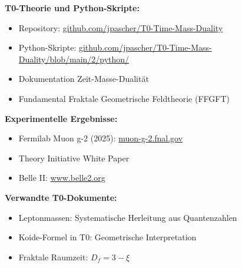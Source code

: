 	\textbf{T0-Theorie und Python-Skripte:}
	\begin{itemize}
		\item Repository: \href{https://github.com/jpascher/T0-Time-Mass-Duality}{github.com/jpascher/T0-Time-Mass-Duality}
		\item Python-Skripte: \href{https://github.com/jpascher/T0-Time-Mass-Duality/blob/main/2/python/}{github.com/jpascher/T0-Time-Mass-Duality/blob/main/2/python/}
		\item Dokumentation Zeit-Masse-Dualität
		\item Fundamental Fraktale Geometrische Feldtheorie (FFGFT)
	\end{itemize}
	
	\textbf{Experimentelle Ergebnisse:}
	\begin{itemize}
		\item Fermilab Muon g-2 (2025): \href{https://muon-g-2.fnal.gov/}{muon-g-2.fnal.gov}
		\item Theory Initiative White Paper
		\item Belle II: \href{https://www.belle2.org/}{www.belle2.org}
	\end{itemize}
	
	\textbf{Verwandte T0-Dokumente:}
	\begin{itemize}
		\item Leptonmassen: Systematische Herleitung aus Quantenzahlen
		\item Koide-Formel in T0: Geometrische Interpretation
		\item Fraktale Raumzeit: $D_f = 3 - \xi$
	\end{itemize}
	